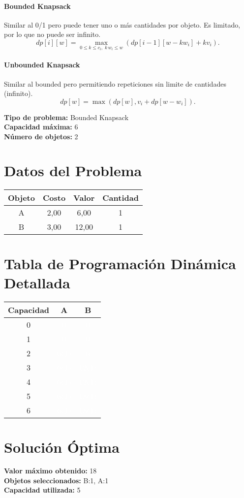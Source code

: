 \documentclass{article}
\begin{document}
\paragraph{Bounded Knapsack} Similar al 0/1 pero puede tener uno o más cantidades por objeto. Es limitado, por lo que no puede ser infinito.
\[
dp[i][w] = 
\max_{0 \leq k \leq c_i,\; k\,w_i \leq w} \left( dp[i-1][w - k w_i] + k v_i \right).
\]

\paragraph{Unbounded Knapsack} Similar al bounded pero permitiendo repeticiones sin limite de cantidades (infinito).
\[
dp[w] = \max ( dp[w], v_i + dp[w - w_i] ).
\]

\thispagestyle{empty}
\newpage
\textbf{Tipo de problema:} Bounded Knapsack\\
\textbf{Capacidad máxima:} 6\\
\textbf{Número de objetos:} 2\\

\section*{Datos del Problema}
\begin{tabular}{|c|c|c|c|}
\hline
Objeto & Costo & Valor & Cantidad \\
\hline
A & 2,00 & 6,00 & 1 \\
B & 3,00 & 12,00 & 1 \\
\hline
\end{tabular}

\section*{Tabla de Programación Dinámica Detallada}
\begin{center}
\scriptsize
\begin{tabular}{|c|c|c|}
\hline
Capacidad & A & B \\ \hline
0 & \cellcolor{rojo}\textcolor{white}{0} & \cellcolor{rojo}\textcolor{white}{0} \\ \hline
1 & \cellcolor{rojo}\textcolor{white}{0} & \cellcolor{rojo}\textcolor{white}{0} \\ \hline
2 & \cellcolor{verde}\textcolor{white}{6(1)} & \cellcolor{rojo}\textcolor{white}{6} \\ \hline
3 & \cellcolor{verde}\textcolor{white}{6(1)} & \cellcolor{verde}\textcolor{white}{12(1)} \\ \hline
4 & \cellcolor{verde}\textcolor{white}{6(1)} & \cellcolor{verde}\textcolor{white}{12(1)} \\ \hline
5 & \cellcolor{verde}\textcolor{white}{6(1)} & \cellcolor{verde}\textcolor{white}{18(1)} \\ \hline
6 & \cellcolor{verde}\textcolor{white}{6(1)} & \cellcolor{verde}\textcolor{white}{18(1)} \\ \hline
\end{tabular}
\end{center}
\normalsize

\section*{Solución Óptima}
\textbf{Valor máximo obtenido:} 18\\
\textbf{Objetos seleccionados:} B:1, A:1\\
\textbf{Capacidad utilizada:} 5\\
\end{document}
